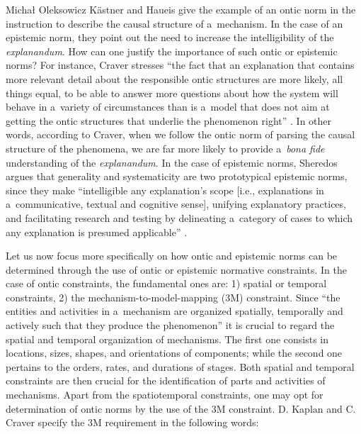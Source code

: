 \begin{artengenv}{Michał Oleksowicz}
Kästner and Haueis give the example of an ontic norm in the instruction to describe the causal structure of a~mechanism. In the case of an epistemic norm, they point out the need to increase the intelligibility of the \textit{explanandum}. How can one justify the importance of such ontic or epistemic norms? For instance, Craver stresses ``the fact that an explanation that contains more relevant detail about the responsible ontic structures are more likely, all things equal, to be able to answer more questions about how the system will behave in a~variety of circumstances than is a~model that does not aim at getting the ontic structures that underlie the phenomenon right''
\parencite[][p.41]{kaiser_ontic_2014}. %
 In other words, according to Craver, when we follow the ontic norm of parsing the causal structure of the phenomena, we are far more likely to provide a~\textit{bona fide} understanding of the \textit{explanandum}. In the case of epistemic norms, Sheredos argues that generality and systematicity are two prototypical epistemic norms, since they make ``intelligible any explanation's scope [i.e., explanations in a~communicative, textual and cognitive sense], unifying explanatory practices, and facilitating research and testing by delineating a~category of cases to which any explanation is presumed applicable'' 
\parencite[][p.933]{sheredos_re-reconciling_2016}.%


Let us now focus more specifically on how ontic and epistemic norms can be determined through the use of ontic or epistemic normative constraints. In the case of ontic constraints, the fundamental ones are: 1) spatial or temporal constraints, 2) the mechanism-to-model-mapping (3M) constraint. Since ``the entities and activities in a~mechanism are organized spatially, temporally and actively such that they produce the phenomenon''
\parencite[][p.20]{craver_search_2013} %
 it is crucial to regard the spatial and temporal organization of mechanisms. The first one consists in locations, sizes, shapes, and orientations of components; while the second one pertains to the orders, rates, and durations of stages. Both spatial and temporal constraints are then crucial for the identification of parts and activities of mechanisms. Apart from the spatiotemporal constraints, one may opt for determination of ontic norms by the use of the 3M constraint. D. Kaplan and C. Craver specify the 3M requirement in the following words:


\end{artengenv}

